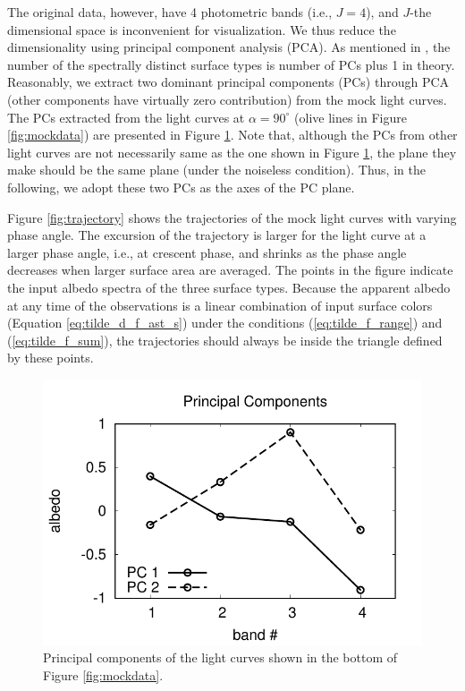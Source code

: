 \documentclass[iop,numberedappendix,apj,]{emulateapj}
\begin{document}
The original data, however, have 4 photometric bands (i.e., $J=4$), and $J$-the dimensional space is inconvenient for visualization. 
We thus reduce the dimensionality using principal component analysis (PCA). 
As mentioned in \citet{Cowan2011}, the number of the spectrally distinct surface types is number of PCs plus 1 in theory. 
Reasonably, we extract two dominant principal components (PCs) through PCA (other components have virtually zero contribution) from the mock light curves. 
The PCs extracted from the light curves at $\alpha = 90^{\circ }$ (olive lines in Figure \ref{fig:mockdata}) are presented in Figure \ref{fig:PCs}. 
Note that, although the PCs from other light curves are not necessarily same as the one shown in Figure \ref{fig:PCs}, the plane they make should be the same plane (under the noiseless condition). Thus, in the following, we adopt these two PCs as the axes of the PC plane. 

Figure \ref{fig:trajectory} shows the trajectories of the mock light curves with varying phase angle. 
The excursion of the trajectory is larger for the light curve at a larger phase angle, i.e., at crescent phase, and shrinks as the phase angle decreases when larger surface area are averaged. 
The points in the figure indicate the input albedo spectra of the three surface types. 
Because the apparent albedo at any time of the observations is a linear combination of input surface colors (Equation \ref{eq:tilde_d_f_ast_s}) under the conditions (\ref{eq:tilde_f_range}) and (\ref{eq:tilde_f_sum}), the trajectories should always be inside the triangle defined by these points.  
 
\begin{figure}[tbh!]
    \begin{center}
\includegraphics[width=\hsize]{PCA_V_jn.pdf}
    \end{center}
    \caption{Principal components of the light curves shown in the bottom of Figure \ref{fig:mockdata}. }
\label{fig:PCs}
\end{figure}
\end{document}
